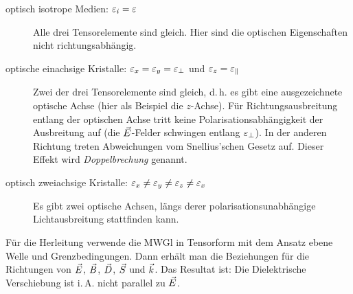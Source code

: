 \begin{description}
\item[optisch isotrope Medien:  
  $\varepsilon_i = \varepsilon$] 
  Alle drei Tensorelemente sind
  gleich. Hier sind die optischen Eigenschaften nicht
  richtungsabhängig.
\item[optische einachsige Kristalle: 
  $\varepsilon_x=\varepsilon_y=\varepsilon_\bot$ und $\varepsilon_z=\varepsilon_\parallel$]
  Zwei der drei Tensorelemente sind gleich, d.\,h. es gibt eine ausgezeichnete
  optische Achse (hier als Beispiel die $z$-Achse). Für
  Richtungsausbreitung entlang der optischen Achse tritt keine
  Polarisationsabhängigkeit der Ausbreitung auf (die $\vec{E}$-Felder
  schwingen entlang $\varepsilon_\bot$). In der anderen Richtung treten
  Abweichungen vom Snellius'schen Gesetz auf.
  Dieser Effekt wird \emph{Doppelbrechung}
  genannt.
\item[optisch zweiachsige Kristalle:
  $\varepsilon_x\neq\varepsilon_y\neq\varepsilon_z\neq\varepsilon_x$]
  Es gibt zwei optische Achsen, längs derer polarisationsunabhängige
  Lichtausbreitung stattfinden kann.
\end{description}
Für die Herleitung verwende die MWGl in Tensorform mit dem Ansatz
ebene Welle und Grenzbedingungen.
Dann erhält man die Beziehungen für die Richtungen von $\vec{E}$,
$\vec{B}$, $\vec{D}$, $\vec{S}$ und $\vec{k}$.
Das Resultat ist:
Die Dielektrische Verschiebung ist i.\,A. nicht parallel zu $\vec{E}$.

